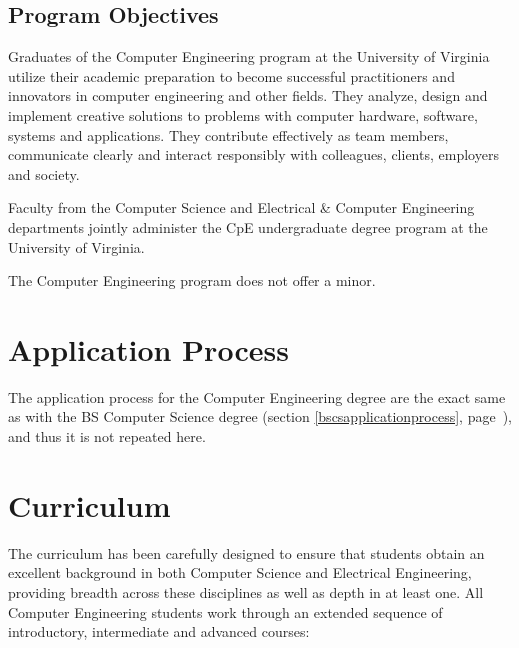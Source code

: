\documentclass[10pt,letter,twocolumn]{book}
\newcommand{\mysection}[1]{\section{#1}\renewcommand{\rightmark}{#1}}
\begin{document}
\subsection{Program Objectives}

Graduates of the Computer Engineering program at the
University of Virginia utilize their academic preparation
to become successful practitioners and innovators in
computer engineering and other fields. They analyze,
design and implement creative solutions to problems
with computer hardware, software, systems and
applications. They contribute effectively as team
members, communicate clearly and interact responsibly
with colleagues, clients, employers and society.

Faculty from the Computer Science and Electrical \& Computer
Engineering departments jointly administer the CpE undergraduate
degree program at the University of Virginia.

The Computer Engineering program does not offer a minor.


\mysection{Application Process}
\label{bscpeapplicationprocess}

The application process for the Computer Engineering degree are the
exact same as with the BS Computer Science degree (section
\ref{bscsapplicationprocess}, page~\pageref{bscsapplicationprocess}),
and thus it is not repeated here.


\mysection{Curriculum} %

The curriculum has been carefully designed to ensure that students
obtain an excellent background in both Computer Science and Electrical
Engineering, providing breadth across these disciplines as well as
depth in at least one. All Computer Engineering students work through
an extended sequence of introductory, intermediate and advanced
courses:
\end{document}
